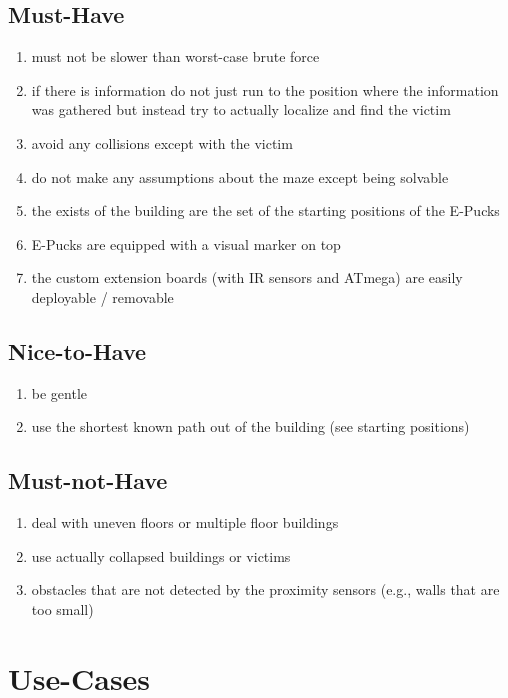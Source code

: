 \documentclass[a4paper,parskip,headheight=38pt]{scrartcl} %
\begin{document}
\subsection{Must-Have}
\begin{enumerate}[label=\musthave]
\item must not be slower than worst-case brute force
\item if there is information do not just run to the position where the information was gathered but instead try to actually localize and find the victim
\item avoid any collisions except with the victim
\item do not make any assumptions about the maze except being solvable
\item the exists of the building are the set of the starting positions of the E-Pucks
\item E-Pucks are equipped with a visual marker on top
\item the custom extension boards (with IR sensors and ATmega) are easily deployable / removable
\end{enumerate}

\subsection{Nice-to-Have}
\begin{enumerate}[label=\nicetohave]
\item be gentle
\item use the shortest known path out of the building (see starting positions)
\end{enumerate}

\subsection{Must-not-Have}
\begin{enumerate}[label=\mustnothave]
\item deal with uneven floors or multiple floor buildings
\item use actually collapsed buildings or victims
\item obstacles that are not detected by the proximity sensors (e.g., walls that are too small)
\end{enumerate}


\section{Use-Cases}
\end{document}
